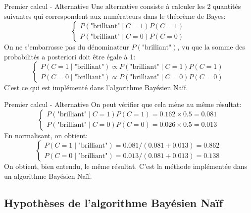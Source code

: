 \begin{frame}{Premier calcul - Alternative}
	Une alternative consiste à calculer les 2 quantités suivantes qui correspondent aux numérateurs dans le théorème de Bayes:
	\begin{equation}
		\begin{cases}
			P(\text{"brilliant"} \mid C = 1) P(C=1) \\
			P(\text{"brilliant"} \mid C = 0) P(C=0)
		\end{cases}
		\nonumber
	\end{equation}
	\pause
	On ne s'embarrasse pas du dénominateur $P(\text{"brilliant"})$, vu que la somme des probabilités a posteriori doit être égale à 1:
	\begin{equation}
		\begin{cases}
			P(C = 1 \mid \text{"brilliant"}) \propto P(\text{"brilliant"} \mid C = 1) P(C=1) \\
			P(C = 0 \mid \text{"brilliant"}) \propto P(\text{"brilliant"} \mid C = 0) P(C=0)
		\end{cases}
		\nonumber
	\end{equation}
	C'est ce qui est implémenté dans l'algorithme Bayésien Naïf.
\end{frame}

\begin{frame}{Premier calcul - Alternative}
	On peut vérifier que cela mène au même résultat:
	\begin{equation}
		\begin{cases}
			P(\text{"brilliant"} \mid C = 1) P(C=1) = 0.162 \times 0.5 = 0.081 \\
			P(\text{"brilliant"} \mid C = 0) P(C=0) = 0.026 \times 0.5 = 0.013
		\end{cases}
		\nonumber
	\end{equation}	
	En normalisant, on obtient:
	\begin{equation}
		\begin{cases}
			P(C = 1 \mid \text{"brilliant"}) = 0.081 / (0.081 + 0.013) =  0.862 \\
			P(C = 0 \mid \text{"brilliant"}) = 0.013 / (0.081 + 0.013) =  0.138
		\end{cases}
		\nonumber
	\end{equation}
	On obtient, bien entendu, le même résultat. C'est la méthode implémentée dans un algorithme Bayésien Naïf.
\end{frame}

\subsection[Hypothèses de l'algorithme Bayésien Naïf]{Hypothèses de l'algorithme Bayésien Naïf}

